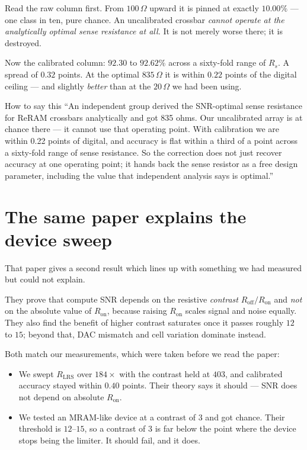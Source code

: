 \documentclass[11pt,a4paper]{report}
\begin{document}
Read the raw column first. From $100\,\Omega$ upward it is pinned at exactly
$10.00\%$ --- one class in ten, pure chance. An uncalibrated crossbar
\emph{cannot operate at the analytically optimal sense resistance at all.} It
is not merely worse there; it is destroyed.

Now the calibrated column: $92.30$ to $92.62\%$ across a sixty-fold range of
$R_s$. A spread of $0.32$ points. At the optimal $835\,\Omega$ it is within
$0.22$ points of the digital ceiling --- and slightly \emph{better} than at
the $20\,\Omega$ we had been using.

\begin{saybox}{How to say this}
``An independent group derived the SNR-optimal sense resistance for ReRAM
crossbars analytically and got 835 ohms. Our uncalibrated array is at chance
there --- it cannot use that operating point. With calibration we are within
0.22 points of digital, and accuracy is flat within a third of a point across
a sixty-fold range of sense resistance. So the correction does not just
recover accuracy at one operating point; it hands back the sense resistor as a
free design parameter, including the value that independent analysis says is
optimal.''
\end{saybox}

\section{The same paper explains the device sweep}

That paper gives a second result which lines up with something we had measured
but could not explain.

They prove that compute SNR depends on the resistive \emph{contrast}
$R_{\mathrm{off}}/R_{\mathrm{on}}$ and \emph{not} on the absolute value of
$R_{\mathrm{on}}$, because raising $R_{\mathrm{on}}$ scales signal and noise
equally. They also find the benefit of higher contrast saturates once it
passes roughly $12$ to $15$; beyond that, DAC mismatch and cell variation
dominate instead.

Both match our measurements, which were taken before we read the paper:

\begin{itemize}
\item We swept $R_{\mathrm{LRS}}$ over $184\times$ with the contrast held at
      $403$, and calibrated accuracy stayed within $0.40$ points. Their theory
      says it should --- SNR does not depend on absolute $R_{\mathrm{on}}$.
\item We tested an MRAM-like device at a contrast of $3$ and got chance. Their
      threshold is $12$--$15$, so a contrast of $3$ is far below the point
      where the device stops being the limiter. It should fail, and it does.
\end{itemize}
\end{document}
